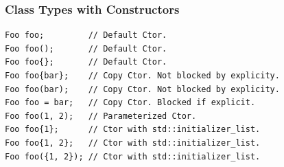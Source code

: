 \subsubsection{Class Types with Constructors}

\begin{mdframed}[backgroundcolor=gray!10,linecolor=Firebrick4,nobreak=true]
\begin{verbatim}
Foo foo;         // Default Ctor.
Foo foo();       // Default Ctor.
Foo foo{};       // Default Ctor.
Foo foo{bar};    // Copy Ctor. Not blocked by explicity.
Foo foo(bar);    // Copy Ctor. Not blocked by explicity.
Foo foo = bar;   // Copy Ctor. Blocked if explicit.
Foo foo(1, 2);   // Parameterized Ctor.
Foo foo{1};      // Ctor with std::initializer_list.
Foo foo{1, 2};   // Ctor with std::initializer_list.
Foo foo({1, 2}); // Ctor with std::initializer_list.
\end{verbatim}
\end{mdframed}

